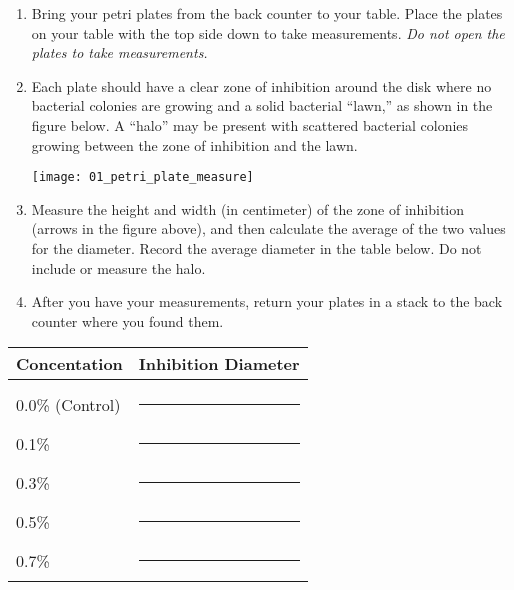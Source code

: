 \documentclass[12pt]{exam}
\begin{document}
\begin{questions}
\begin{enumerate}

	\item Bring your petri plates from the back counter to your table. Place the plates on your table with the top side down to take measurements. \emph{Do not open the plates to take measurements.} 
	
	\item Each plate should have%
	a clear zone of inhibition around the disk where no bacterial colonies are growing and a solid
	bacterial “lawn,” as shown in the figure below. A “halo” may be present with
	scattered bacterial colonies growing between the zone of inhibition and the lawn.
	
	
		{\centering\texttt{[image: 01\_petri\_plate\_measure]}\par
		}

	\item Measure the height and width (in centimeter) of the zone 
	of inhibition (arrows in the figure above), and then calculate 
	the average of the two values for the diameter. Record the average 
	diameter in the table below. Do not include or measure the halo.


	\item After you have your measurements, return your plates in a stack to the back counter where you found them.
	
\end{enumerate}

\begin{longtable}[c]{lc}
	\toprule
		Concentation	&	Inhibition Diameter	\tabularnewline
	\midrule
		& \tabularnewline[0.5em]
		0.0\% (Control)	& \rule{0.75in}{0.4pt} \tabularnewline[1.5em]
		0.1\%	& \rule{0.75in}{0.4pt} \tabularnewline[1.5em]
		0.3\%	& \rule{0.75in}{0.4pt} \tabularnewline[1.5em]
		0.5\%	& \rule{0.75in}{0.4pt} \tabularnewline[1.5em]
		0.7\%	& \rule{0.75in}{0.4pt} \tabularnewline
	\bottomrule
\end{longtable}


\end{questions}
\end{document}
